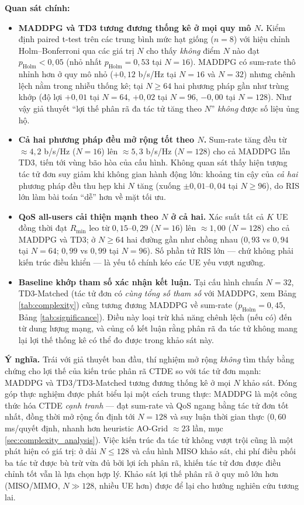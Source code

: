 \textbf{Quan sát chính:}
\begin{itemize}[leftmargin=*]
\item \textbf{MADDPG và TD3 tương đương thống kê ở mọi quy mô $N$.}
Kiểm định paired t-test trên các trung bình mức hạt giống ($n=8$) với
hiệu chỉnh Holm--Bonferroni qua các giá trị $N$ cho thấy \emph{không}
điểm $N$ nào đạt $p_{\text{Holm}} < 0{,}05$ (nhỏ nhất
$p_{\text{Holm}} = 0{,}53$ tại $N=16$). MADDPG có sum-rate thô nhỉnh
hơn ở quy mô nhỏ ($+0{,}12$ b/s/Hz tại $N=16$ và $N=32$) nhưng chênh
lệch nằm trong nhiễu thống kê; tại $N \geq 64$ hai phương pháp gần như
trùng khớp (độ lợi $+0{,}01$ tại $N=64$, $+0{,}02$ tại $N=96$,
$-0{,}00$ tại $N=128$). Như vậy giả thuyết ``lợi thế phân rã đa tác
tử tăng theo $N$'' \emph{không} được số liệu ủng hộ.
\item \textbf{Cả hai phương pháp đều mở rộng tốt theo $N$.} Sum-rate
tăng đều từ $\approx 4{,}2$ b/s/Hz ($N=16$) lên $\approx 5{,}3$ b/s/Hz
($N=128$) cho cả MADDPG lẫn TD3, tiến tới vùng bão hòa của cấu hình.
Không quan sát thấy hiện tượng tác tử đơn suy giảm khi không gian hành
động lớn: khoảng tin cậy của \emph{cả hai} phương pháp đều thu hẹp khi
$N$ tăng (xuống $\pm 0{,}01$--$0{,}04$ tại $N \geq 96$), do RIS lớn làm
bài toán ``dễ'' hơn về mặt tối ưu.
\item \textbf{QoS all-users cải thiện mạnh theo $N$ ở cả hai.} Xác suất
tất cả $K$ UE đồng thời đạt $R_{\min}$ leo từ $0{,}15$--$0{,}29$ ($N=16$)
lên $\approx 1{,}00$ ($N=128$) cho cả MADDPG và TD3; ở $N \geq 64$ hai
đường gần như chồng nhau ($0{,}93$ vs $0{,}94$ tại $N=64$; $0{,}99$
vs $0{,}99$ tại $N=96$). Số phần tử RIS lớn --- chứ không phải kiến
trúc điều khiển --- là yếu tố chính kéo các UE yếu vượt ngưỡng.
\item \textbf{Baseline khớp tham số xác nhận kết luận.} Tại cấu hình
chuẩn $N=32$, TD3-Matched (tác tử đơn có \emph{cùng tổng số tham số}
với MADDPG, xem Bảng \ref{tab:complexity}) cũng tương đương MADDPG về
sum-rate ($p_{\text{Holm}} = 0{,}45$, Bảng \ref{tab:significance}).
Điều này loại trừ khả năng chênh lệch (nếu có) đến từ dung lượng mạng,
và củng cố kết luận rằng phân rã đa tác tử không mang lại lợi thế thống
kê có thể đo được trong khảo sát này.
\end{itemize}

\textbf{Ý nghĩa.} Trái với giả thuyết ban đầu, thí nghiệm mở rộng
\emph{không} tìm thấy bằng chứng cho lợi thế của kiến trúc phân rã CTDE
so với tác tử đơn mạnh: MADDPG và TD3/TD3-Matched tương đương thống kê
ở mọi $N$ khảo sát. Đóng góp thực nghiệm được phát biểu lại một cách
trung thực: MADDPG là một công thức hóa CTDE \emph{cạnh tranh} --- đạt
sum-rate và QoS ngang bằng tác tử đơn tốt nhất, đồng thời mở rộng ổn
định tới $N=128$ và suy luận thời gian thực ($0{,}60$ ms/quyết định,
nhanh hơn heuristic AO-Grid $\approx 23$ lần, mục
\ref{sec:complexity_analysis}). Việc kiến trúc đa tác tử không vượt
trội cũng là một phát hiện có giá trị: ở dải $N \leq 128$ và cấu hình
MISO khảo sát, chi phí điều phối ba tác tử được bù trừ vừa đủ bởi lợi
ích phân rã, khiến tác tử đơn được điều chỉnh tốt vẫn là lựa chọn hợp
lý. Khảo sát lợi thế phân rã ở quy mô lớn hơn (MISO/MIMO, $N \gg 128$,
nhiều UE hơn) được để lại cho hướng nghiên cứu tương lai.


